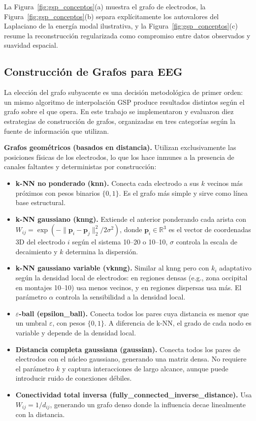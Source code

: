 La Figura~\ref{fig:gsp_conceptos}(a) muestra el grafo de electrodos, la Figura~\ref{fig:gsp_conceptos}(b) separa explícitamente los autovalores del Laplaciano de la energía modal ilustrativa, y la Figura~\ref{fig:gsp_conceptos}(c) resume la reconstrucción regularizada como compromiso entre datos observados y suavidad espacial.

\subsection{Construcción de Grafos para EEG}
\label{sec:graph_construction}

La elección del grafo subyacente es una decisión metodológica de primer orden: un mismo algoritmo de interpolación GSP produce resultados distintos según el grafo sobre el que opera. En este trabajo se implementaron y evaluaron diez estrategias de construcción de grafos, organizadas en tres categorías según la fuente de información que utilizan.

\textbf{Grafos geométricos (basados en distancia).} Utilizan exclusivamente las posiciones físicas de los electrodos, lo que los hace inmunes a la presencia de canales faltantes y deterministas por construcción:

\begin{itemize}[leftmargin=*,itemsep=1pt,topsep=2pt]
\item \textbf{k-NN no ponderado (knn).} Conecta cada electrodo a sus $k$ vecinos más próximos con pesos binarios $\{0,1\}$. Es el grafo más simple y sirve como línea base estructural.
\item \textbf{k-NN gaussiano (knng).} Extiende el anterior ponderando cada arista con $W_{ij} = \exp(-\|\mathbf{p}_i - \mathbf{p}_j\|_2^2 / 2\sigma^2)$, donde $\mathbf{p}_i \in \mathbb{R}^3$ es el vector de coordenadas 3D del electrodo $i$ según el sistema 10--20 o 10--10, $\sigma$ controla la escala de decaimiento y $k$ determina la dispersión.
\item \textbf{k-NN gaussiano variable (vknng).} Similar al knng pero con $k_i$ adaptativo según la densidad local de electrodos: en regiones densas (e.g., zona occipital en montajes 10--10) usa menos vecinos, y en regiones dispersas usa más. El parámetro $\alpha$ controla la sensibilidad a la densidad local.
\item \textbf{$\varepsilon$-ball (epsilon\_ball).} Conecta todos los pares cuya distancia es menor que un umbral $\varepsilon$, con pesos $\{0,1\}$. A diferencia de k-NN, el grado de cada nodo es variable y depende de la densidad local.
\item \textbf{Distancia completa gaussiana (gaussian).} Conecta todos los pares de electrodos con el núcleo gaussiano, generando una matriz densa. No requiere el parámetro $k$ y captura interacciones de largo alcance, aunque puede introducir ruido de conexiones débiles.
\item \textbf{Conectividad total inversa (fully\_connected\_inverse\_distance).} Usa $W_{ij} = 1/d_{ij}$, generando un grafo denso donde la influencia decae linealmente con la distancia.
\end{itemize}

